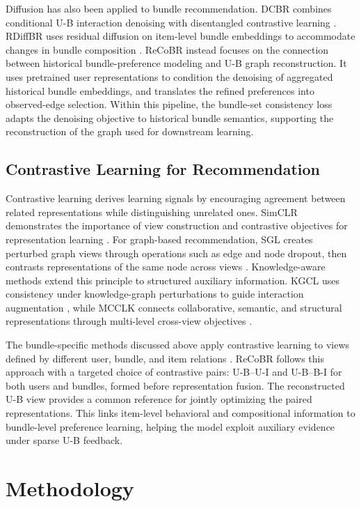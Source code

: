 \documentclass[letterpaper]{article}
\begin{document}
Diffusion has also been applied to bundle recommendation. DCBR combines conditional U-B interaction denoising with disentangled contrastive learning \cite{li2025dcbr}. RDiffBR uses residual diffusion on item-level bundle embeddings to accommodate changes in bundle composition \cite{zhang2026rdiffbr}. ReCoBR instead focuses on the connection between historical bundle-preference modeling and U-B graph reconstruction. It uses pretrained user representations to condition the denoising of aggregated historical bundle embeddings, and translates the refined preferences into observed-edge selection. Within this pipeline, the bundle-set consistency loss adapts the denoising objective to historical bundle semantics, supporting the reconstruction of the graph used for downstream learning.

\subsection{Contrastive Learning for Recommendation}

Contrastive learning derives learning signals by encouraging agreement between related representations while distinguishing unrelated ones. SimCLR demonstrates the importance of view construction and contrastive objectives for representation learning \cite{chen2020simclr}. For graph-based recommendation, SGL creates perturbed graph views through operations such as edge and node dropout, then contrasts representations of the same node across views \cite{wu2021sgl}. Knowledge-aware methods extend this principle to structured auxiliary information. KGCL uses consistency under knowledge-graph perturbations to guide interaction augmentation \cite{yang2022kgcl}, while MCCLK connects collaborative, semantic, and structural representations through multi-level cross-view objectives \cite{zou2022mcclk}.

The bundle-specific methods discussed above apply contrastive learning to views defined by different user, bundle, and item relations \cite{ma2022crosscbr,ma2024multicbr}. ReCoBR follows this approach with a targeted choice of contrastive pairs: U-B--U-I and U-B--B-I for both users and bundles, formed before representation fusion. The reconstructed U-B view provides a common reference for jointly optimizing the paired representations. This links item-level behavioral and compositional information to bundle-level preference learning, helping the model exploit auxiliary evidence under sparse U-B feedback.


\section{Methodology}\label{sec:methodology}
\end{document}
